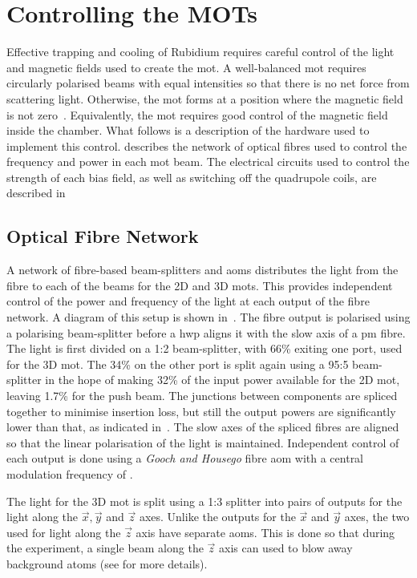 \section{Controlling the MOTs}\label{sec:mot_control} Effective
trapping and cooling of Rubidium requires careful control of the light
and magnetic fields used to create the \ac{mot}. A well-balanced
\ac{mot} requires circularly polarised beams with equal intensities so
that there is no net force from scattering light. Otherwise, the
\ac{mot} forms at a position where the magnetic field is not
zero~\cite{Steane1992}. Equivalently, the \ac{mot} requires good
control of the magnetic field inside the chamber. What follows is a
description of the hardware used to implement this control.
 describes the network of optical
fibres used to control the frequency and power in each \ac{mot} beam.
The electrical circuits used to control the strength of each bias
field, as well as switching off the quadrupole coils, are described
in~ 
\subsection{Optical Fibre
Network}\label{subsec:optical_fibre} A network of fibre-based
beam-splitters and \acp{aom} distributes the light from the \Muquans
fibre to each of the beams for the 2D and 3D \acp{mot}. This provides
independent control of the power and frequency of the light at each
output of the fibre network. A diagram of this setup is shown
in~. The \Muquans fibre output is
polarised using a polarising beam-splitter before a \ac{hwp} aligns it
with the slow axis of a \ac{pm} fibre. The light is first divided on a
1:2 beam-splitter, with 66\% exiting one port, used for the 3D
\ac{mot}. The 34\% on the other port is split again using a 95:5
beam-splitter in the hope of making 32\% of the input power available
for the 2D \ac{mot}, leaving 1.7\% for the push beam.
The junctions between components are spliced together to minimise
insertion loss, but still the output powers are significantly lower than that, as
indicated in~. The slow axes of the spliced fibres are aligned so that the
linear polarisation of the light is maintained. Independent control of each
output is done using a \textit{Gooch and Housego} fibre \ac{aom} with
a central modulation frequency of . \par\noindent The light
for the 3D \ac{mot} is split using a 1:3 splitter into pairs of
outputs for the light along the \(\vec{x},\vec{y}\) and \(\vec{z}\)
axes. Unlike the outputs for the $\vec{x}$ and $\vec{y}$ axes, the two used for light
along the \(\vec{z}\) axis have separate \acp{aom}. This is done so
that during the experiment, a single beam along the \(\vec{z}\) axis
can used to blow away background atoms (see
 for more details).


